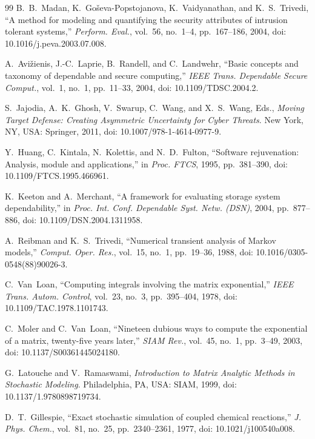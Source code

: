 \documentclass[journal]{IEEEtran}
\begin{document}
\begin{thebibliography}{99}
 B.~B.~Madan, K.~Go\v{s}eva-Popstojanova,
K.~Vaidyanathan, and K.~S.~Trivedi, ``A method for modeling and quantifying the
security attributes of intrusion tolerant systems,'' \emph{Perform. Eval.},
vol.~56, no.~1--4, pp.~167--186, 2004, doi: 10.1016/j.peva.2003.07.008.

 A.~Avi\v{z}ienis, J.-C.~Laprie, B.~Randell, and
C.~Landwehr, ``Basic concepts and taxonomy of dependable and secure computing,''
\emph{IEEE Trans. Dependable Secure Comput.}, vol.~1, no.~1, pp.~11--33, 2004,
doi: 10.1109/TDSC.2004.2.

 S.~Jajodia, A.~K.~Ghosh, V.~Swarup, C.~Wang, and
X.~S.~Wang, Eds., \emph{Moving Target Defense: Creating Asymmetric Uncertainty
for Cyber Threats}. New York, NY, USA: Springer, 2011,
doi: 10.1007/978-1-4614-0977-9.

 Y.~Huang, C.~Kintala, N.~Kolettis, and
N.~D.~Fulton, ``Software rejuvenation: Analysis, module and applications,'' in
\emph{Proc. FTCS}, 1995, pp.~381--390, doi: 10.1109/FTCS.1995.466961.

 K.~Keeton and A.~Merchant, ``A framework for
evaluating storage system dependability,'' in \emph{Proc. Int. Conf. Dependable
Syst. Netw. (DSN)}, 2004, pp.~877--886, doi: 10.1109/DSN.2004.1311958.

 A.~Reibman and K.~S.~Trivedi, ``Numerical
transient analysis of Markov models,'' \emph{Comput. Oper. Res.}, vol.~15,
no.~1, pp.~19--36, 1988, doi: 10.1016/0305-0548(88)90026-3.

 C.~Van~Loan, ``Computing integrals involving the matrix
exponential,'' \emph{IEEE Trans. Autom. Control}, vol.~23, no.~3, pp.~395--404,
1978, doi: 10.1109/TAC.1978.1101743.

 C.~Moler and C.~Van~Loan, ``Nineteen dubious ways to
compute the exponential of a matrix, twenty-five years later,'' \emph{SIAM
Rev.}, vol.~45, no.~1, pp.~3--49, 2003, doi: 10.1137/S00361445024180.

 G.~Latouche and V.~Ramaswami, \emph{Introduction to
Matrix Analytic Methods in Stochastic Modeling}. Philadelphia, PA, USA: SIAM,
1999, doi: 10.1137/1.9780898719734.

 D.~T.~Gillespie, ``Exact stochastic simulation of
coupled chemical reactions,'' \emph{J. Phys. Chem.}, vol.~81, no.~25,
pp.~2340--2361, 1977, doi: 10.1021/j100540a008.

\end{thebibliography}
\end{document}
